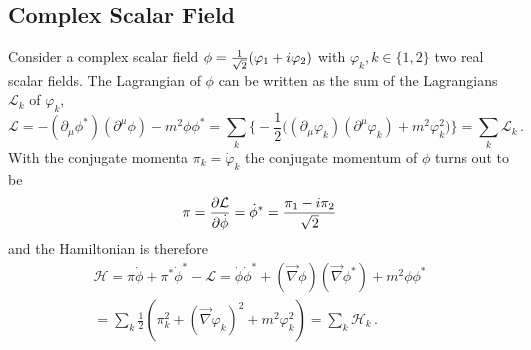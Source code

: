 \subsection{Complex Scalar Field}

Consider a complex scalar field ${\phi=\frac{1}{\sqrt{2}}(\varphi_1+{i}\varphi_2)}$ with ${\varphi_k,k\in\{1,2\}}$ two real scalar fields. The Lagrangian of $\phi$ can be written as the sum of the Lagrangians $\mathcal{L}_k$ of $\varphi_k$,
\begin{equation}
    \mathcal{L}=-(\partial_\mu\phi^*)(\partial^\mu\phi)-m^2\phi\phi^*=\sum_{k}\Big\{-\frac{1}{2}\Big((\partial_\mu\varphi_k)(\partial^\mu\varphi_k)+m^2\varphi_k^2\Big)\Big\}=\sum_k\mathcal{L}_k\,.
\end{equation}
With the conjugate momenta $\pi_k=\dot{\varphi}_k$ the conjugate momentum of $\phi$ turns out to be
\begin{equation}
    \pi=\frac{\partial\mathcal{L}}{\partial\dot{\phi}}=\dot{\phi}^*=\frac{\pi_1-{i}\pi_2}{\sqrt{2}}
\end{equation}
and the Hamiltonian is therefore
\begin{multline}
    \mathcal{H}=\pi\dot{\phi}+\pi^*\dot{\phi}^*-\mathcal{L}=\dot{\phi}\dot{\phi}^*+(\vec{\nabla}\phi)(\vec{\nabla}\phi^*)+m^2\phi\phi^*\\
    =\sum_k\frac{1}{2}(\pi_k^2+(\vec{\nabla}\varphi_k)^2+m^2\varphi_k^2)=\sum_k\mathcal{H}_k\,.
\end{multline}

